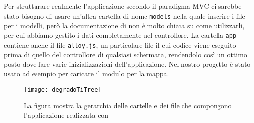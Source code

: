             \noindent Per strutturare realmente l'applicazione secondo il paradigma MVC
            ci sarebbe stato bisogno di usare un'altra cartella di nome \texttt{models}
            nella quale inserire i file \js{} per i modelli, però la documentazione
            di \tisdk{} non è molto chiara su come utilizzarli, per cui
            abbiamo gestito i dati completamente nel controllore.
            \noindent La cartella \texttt{app} contiene anche il file \texttt{alloy.js}, un particolare file
            \js{} il cui codice viene eseguito prima di quello del controllore
            di qualsiasi schermata, rendendolo così un ottimo posto dove fare
            varie inizializzazioni dell'applicazione. Nel nostro progetto è
            stato usato ad esempio per caricare il modulo per la mappa.

            \begin{figure}[H]
                \centering
                \texttt{[image: degradoTiTree]}
                \caption{
                La figura mostra la gerarchia delle cartelle e dei file che
                compongono l'applicazione realizzata con \tisdk{}
                }
                \label{fig:degradoTiTree}
            \end{figure}

